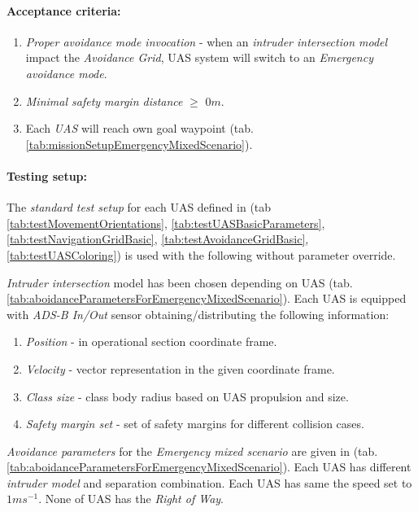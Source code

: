     \noindent \paragraph{Acceptance criteria:}
    \begin{enumerate}
        \item \emph{Proper avoidance mode invocation} - when an  \emph{intruder intersection model} impact the \emph{Avoidance Grid}, UAS system will switch to an \emph{Emergency avoidance mode}.
        
        \item\emph{Minimal safety margin distance} $\ge$ $0 m$.
        
        \item Each \emph{UAS} will reach own goal waypoint (tab. \ref{tab:missionSetupEmergencyMixedScenario}).
    \end{enumerate}
    
    
    \noindent\paragraph{Testing setup:} The \emph{standard test setup} for each UAS defined in (tab \ref{tab:testMovementOrientations}, \ref{tab:testUASBasicParameters}, \ref{tab:testNavigationGridBasic}, \ref{tab:testAvoidanceGridBasic}, \ref{tab:testUASColoring}) is used with the following without parameter override.

    \emph{Intruder intersection} model has been chosen depending on UAS (tab. \ref{tab:aboidanceParametersForEmergencyMixedScenario}). Each UAS is equipped with \emph{ADS-B In/Out} sensor obtaining/distributing the following information:
    \begin{enumerate}
        \item \emph{Position} - in operational section coordinate frame.
        
        \item \emph{Velocity} - vector representation in the given coordinate frame.
        
        \item \emph{Class size} - class body radius based on UAS propulsion and size.
        
        \item \emph{Safety margin set} - set of safety margins for different collision cases.
    \end{enumerate}
    
    \emph{Avoidance parameters} for the \emph{Emergency mixed scenario} are given in (tab. \ref{tab:aboidanceParametersForEmergencyMixedScenario}). Each UAS has different \emph{intruder model} and separation combination. Each UAS has same the speed set to $1 m s^{-1}$. None of UAS has the \emph{Right of Way}. 
    
